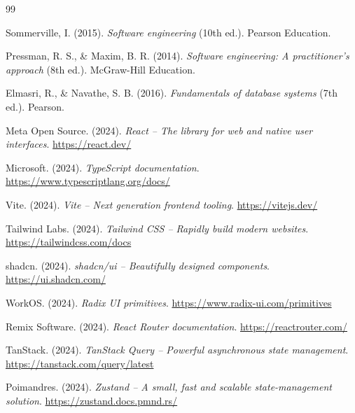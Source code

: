 
\clearpage
\renewcommand{\bibname}{References}

\begin{thebibliography}{99}
\setlength{\itemsep}{6pt}
\raggedright

Sommerville, I. (2015). \textit{Software engineering} (10th ed.). Pearson Education.

Pressman, R. S., \& Maxim, B. R. (2014). \textit{Software engineering: A practitioner's approach} (8th ed.). McGraw-Hill Education.

Elmasri, R., \& Navathe, S. B. (2016). \textit{Fundamentals of database systems} (7th ed.). Pearson.

Meta Open Source. (2024). \textit{React -- The library for web and native user interfaces}. \url{https://react.dev/}

Microsoft. (2024). \textit{TypeScript documentation}. \url{https://www.typescriptlang.org/docs/}

Vite. (2024). \textit{Vite -- Next generation frontend tooling}. \url{https://vitejs.dev/}

Tailwind Labs. (2024). \textit{Tailwind CSS -- Rapidly build modern websites}. \url{https://tailwindcss.com/docs}

shadcn. (2024). \textit{shadcn/ui -- Beautifully designed components}. \url{https://ui.shadcn.com/}

WorkOS. (2024). \textit{Radix UI primitives}. \url{https://www.radix-ui.com/primitives}

Remix Software. (2024). \textit{React Router documentation}. \url{https://reactrouter.com/}

TanStack. (2024). \textit{TanStack Query -- Powerful asynchronous state management}. \url{https://tanstack.com/query/latest}

Poimandres. (2024). \textit{Zustand -- A small, fast and scalable state-management solution}. \url{https://zustand.docs.pmnd.rs/}


\end{thebibliography}
